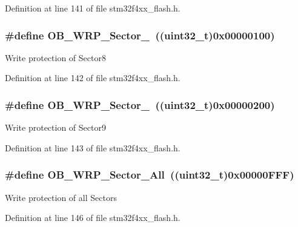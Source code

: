 Definition at line 141 of file stm32f4xx\-\_\-flash.\-h.

\hypertarget{group___option___bytes___write___protection_gaf351164510a07ba8cdcfde8473100c05}{
\subsubsection[{O\-B\-\_\-\-W\-R\-P\-\_\-\-Sector\-\_\-8}]{\setlength{\rightskip}{0pt plus 5cm}\#define O\-B\-\_\-\-W\-R\-P\-\_\-\-Sector\-\_~((uint32\-\_\-t)0x00000100)}}\label{group___option___bytes___write___protection_gaf351164510a07ba8cdcfde8473100c05}
Write protection of Sector8 

Definition at line 142 of file stm32f4xx\-\_\-flash.\-h.

\hypertarget{group___option___bytes___write___protection_ga5441787d51d48a73f85f2f8efe7f2992}{
\subsubsection[{O\-B\-\_\-\-W\-R\-P\-\_\-\-Sector\-\_\-9}]{\setlength{\rightskip}{0pt plus 5cm}\#define O\-B\-\_\-\-W\-R\-P\-\_\-\-Sector\-\_~((uint32\-\_\-t)0x00000200)}}\label{group___option___bytes___write___protection_ga5441787d51d48a73f85f2f8efe7f2992}
Write protection of Sector9 

Definition at line 143 of file stm32f4xx\-\_\-flash.\-h.

\hypertarget{group___option___bytes___write___protection_ga049185e634497456e6d3c7b3dca214d6}{
\subsubsection[{O\-B\-\_\-\-W\-R\-P\-\_\-\-Sector\-\_\-\-All}]{\setlength{\rightskip}{0pt plus 5cm}\#define O\-B\-\_\-\-W\-R\-P\-\_\-\-Sector\-\_\-\-All~((uint32\-\_\-t)0x00000\-F\-F\-F)}}\label{group___option___bytes___write___protection_ga049185e634497456e6d3c7b3dca214d6}
Write protection of all Sectors 

Definition at line 146 of file stm32f4xx\-\_\-flash.\-h.

